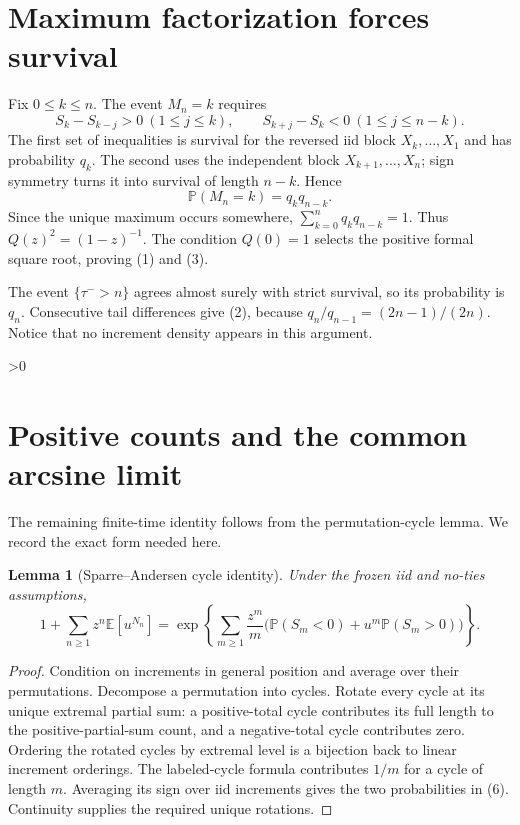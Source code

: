\documentclass[10pt]{article}
\providecommand{\CRevisionRound}{2}
\newtheorem{lemma}{Lemma}
\newcommand{\Pp}{\mathbb P}
\newcommand{\Ee}{\mathbb E}
\begin{document}
\section{Maximum factorization forces survival}
Fix $0\le k\le n$.  The event $M_n=k$ requires
\[
 S_k-S_{k-j}>0\ (1\le j\le k),\qquad
 S_{k+j}-S_k<0\ (1\le j\le n-k).
\]
The first set of inequalities is survival for the reversed iid block
$X_k,\ldots,X_1$ and has probability $q_k$.  The second uses the independent
block $X_{k+1},\ldots,X_n$; sign symmetry turns it into survival of length
$n-k$.  Hence
\begin{equation}
 \Pp(M_n=k)=q_kq_{n-k}.                                   \tag{5}
\end{equation}
Since the unique maximum occurs somewhere,
$\sum_{k=0}^nq_kq_{n-k}=1$.  Thus $Q(z)^2=(1-z)^{-1}$.  The condition
$Q(0)=1$ selects the positive formal square root, proving (1) and (3).

The event $\{\tau^->n\}$ agrees almost surely with strict survival, so its
probability is $q_n$.  Consecutive tail differences give (2), because
$q_n/q_{n-1}=(2n-1)/(2n)$.  Notice that no increment density appears in this
argument.

\ifnum\CRevisionRound>0
\section{Positive counts and the common arcsine limit}
The remaining finite-time identity follows from the permutation-cycle lemma.
We record the exact form needed here.
\begin{lemma}[Sparre--Andersen cycle identity]\label{lem:cycle}
Under the frozen iid and no-ties assumptions,
\begin{equation}
 1+\sum_{n\ge1}z^n\Ee[u^{N_n}]
 =\exp\!\left\{\sum_{m\ge1}\frac{z^m}{m}
 \bigl(\Pp(S_m<0)+u^m\Pp(S_m>0)\bigr)\right\}.          \tag{6}
\end{equation}
\end{lemma}
\begin{proof}
Condition on increments in general position and average over their
permutations.  Decompose a permutation into cycles.  Rotate every cycle at its
unique extremal partial sum: a positive-total cycle contributes its full
length to the positive-partial-sum count, and a negative-total cycle contributes
zero.  Ordering the rotated cycles by extremal level is a bijection back to
linear increment orderings.  The labeled-cycle formula contributes $1/m$ for
a cycle of length $m$.  Averaging its sign over iid increments gives the two
probabilities in (6).  Continuity supplies the required unique rotations.
\end{proof}
\end{document}
